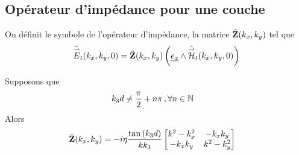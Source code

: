     \subsection{Opérateur d'impédance pour une couche}

        \begin{defn}
            On définit le symbole de l'opérateur d'impédance, la matrice $\hat {\mathbf{Z}}(k_x,k_y)$ tel que 
            \begin{equation}
                \hat {{\overset{\rightarrow}{E}}}_t(k_x,k_y,0) = \hat {\mathbf{Z}}(k_x,k_y) \left(\underline{e_z} \wedge \hat {{\overset{\rightarrow}{\mathcal{H}}}}_t(k_x,k_y,0)\right)
            \end{equation}
        \end{defn}

        \begin{thm}
            Supposons que
                \begin{align}
                k_3d &\not = \dfrac{\pi}{2}+n\pi\,, \forall n \in \mathbb N
            \end{align}
            Alors
            \begin{align}
            \hat {\mathbf{Z}}(k_x,k_y) &= -i\eta\dfrac{\tan\left(k_3d\right)}{kk_3}
                \begin{bmatrix}
                   k^2-k_x^2  & -k_xk_y\\
                    -k_xk_y & k^2-k_y^2\\
                \end{bmatrix}
            \end{align}
        \end{thm}

